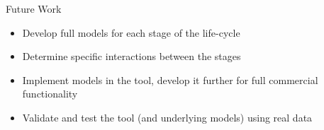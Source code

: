 \documentclass{beamer}
\begin{document}
\begin{frame}{Future Work}
   \begin{itemize}
  	\item Develop full models for each stage of the life-cycle
  	\item Determine specific interactions between the stages
  	\item Implement models in the tool, develop it further for full commercial functionality
  	\item Validate and test the tool (and underlying models) using real data
  \end{itemize}
\end{frame}
\end{document}
